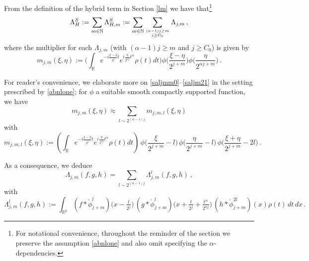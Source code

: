 \documentclass[a4paper,reqno]{amsart}
\numberwithin{equation}{section}
\theoremstyle{definition}
\newcommand{\R}{\mathbb{R}}
\newcommand{\N}{\mathbb{N}}
\def\a{\alpha}
\def\L{\Lambda}
\begin{document}
From the definition of the hybrid term in Section \ref{lm} we have that\footnote{For notational convenience, throughout the reminder of the section we preserve the assumption \eqref{abnlone} and also omit specifying the $\a$-dependencies.}
\begin{equation}\label{lsl}
\L^S_H:=\sum_{m\in\N}  \L^{S}_{H,m}:=\sum_{m\in\N}  \sum_{{(\a-1) j\geq m}\atop{j\geq C_0}} \L_{j,m}\,,
\end{equation}
where the multiplier for each $\L_{j,m}$ (with $(\a-1) j\geq m$ and $j\ge C_0$) is given by
\begin{equation}\label{saljmm}
m_{j,m}(\xi,\eta):=\Big(\int_\R e^{-i\frac{\xi-\eta}{2^j}  t}e^{i\frac{\eta}{2^{\a j}}t^\a}\rho(t)dt\Big)
		\phi\Big(\frac{\xi-\eta}{2^{j+m}}\Big)\phi\Big(\frac{\eta}{2^{\a j+m}}\Big)\,.
\end{equation}

For reader's convenience, we elaborate more on \eqref{saljmm0}--\eqref{saljm21} in the setting prescribed by \eqref{abnlone};
for $\phi$ a suitable smooth compactly supported function, we have	
\begin{equation}\label{saljmm0r}
		m_{j,m}(\xi,\eta)\approx\sum_{l\sim 2^{(\a-1)j}} m_{j,m,l}(\xi,\eta)
\end{equation}
with
\begin{equation}\label{saljmm1r}
	m_{j,m,l}(\xi,\eta):=\left(\int_\R e^{-i\frac{\xi-\eta}{2^j}  t}e^{i\frac{\eta}{2^{\a j}}t^\a}\rho(t)dt\right)\,
	\phi\Big(\frac{\xi}{2^{j+m}}-l\Big)\,\phi\Big(\frac{\eta}{2^{j+m}}-l\Big)\,\phi\Big(\frac{\xi+\eta}{2^{j+m}}-2l\Big)\,.
\end{equation}


As a consequence, we deduce
\begin{equation}\label{saljmsummr}
\L_{j,m}(f,g,h)=\sum_{l\sim 2^{(\a-1)j}}\L^{l}_{j,m}(f,g,h)\,,
\end{equation}
with
\begin{equation}\label{saljm2r}
\L^{l}_{j,m}(f,g,h)\!:=\!\int_{\R^2}\! (f*\check{\phi}_{j+m}^l)\big(x-\tfrac{t}{2^j}\big)\,(g*\check{\phi}_{j+m}^l)\big(x+\tfrac{t}{2^j}+\tfrac{t^\a}{2^{\a j}}\big)\, (h*\check{\phi}_{j+m}^{2l})(x)\rho(t)\,dt\,dx\,.
\end{equation}
\end{document}
